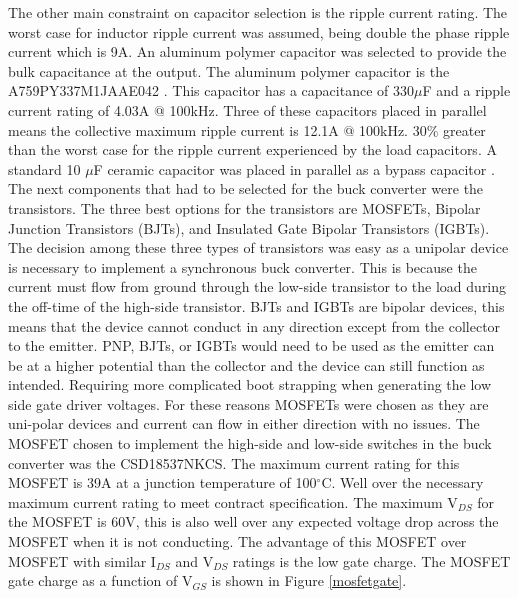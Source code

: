 \documentclass[11pt]{article}
\begin{document}
    \noindent The other main constraint on capacitor selection is the ripple current rating. The worst case for inductor ripple current was assumed, being double the phase ripple current which is 9A. An aluminum polymer capacitor was selected to provide the bulk capacitance at the output. The aluminum polymer capacitor is the A759PY337M1JAAE042 \cite{kemet_charged_single-ended_2017}. This capacitor has a capacitance of 330$\mu$F and a ripple current rating of 4.03A @ 100kHz. Three of these capacitors placed in parallel means the collective maximum ripple current is 12.1A @ 100kHz. 30$\%$ greater than the worst case for the ripple current experienced by the load capacitors. A standard 10 $\mu$F ceramic capacitor was placed in parallel as a bypass capacitor \cite{kemet_charged_single-ended_2017}.
    \newline
    \newline
    \noindent The next components that had to be selected for the buck converter were the transistors. The three best options for the transistors are MOSFETs, Bipolar Junction Transistors (BJTs), and Insulated Gate Bipolar Transistors (IGBTs). The decision among these three types of transistors was easy as a unipolar device is necessary to implement a synchronous buck converter. This is because the current must flow from ground through the low-side transistor to the load during the off-time of the high-side transistor. BJTs and IGBTs are bipolar devices, this means that the device cannot conduct in any direction except from the collector to the emitter. PNP, BJTs, or IGBTs would need to be used as the emitter can be at a higher potential than the collector and the device can still function as intended. Requiring more complicated boot strapping when generating the low side gate driver voltages. For these reasons MOSFETs were chosen as they are uni-polar devices and current can flow in either direction with no issues.
    \newline
    \newline
    \noindent The MOSFET chosen to implement the high-side and low-side switches in the buck converter was the CSD18537NKCS. The maximum current rating for this MOSFET is 39A at a junction temperature of 100$^{\circ}$C. Well over the necessary maximum current rating to meet contract specification. The maximum V$_{DS}$ for the MOSFET is 60V, this is also well over any expected voltage drop across the MOSFET when it is not conducting. The advantage of this MOSFET over MOSFET with similar I$_{DS}$ and V$_{DS}$ ratings is the low gate charge. The MOSFET gate charge as a function of V$_{GS}$ is shown in Figure \ref{mosfetgate}.
    
\end{document}
